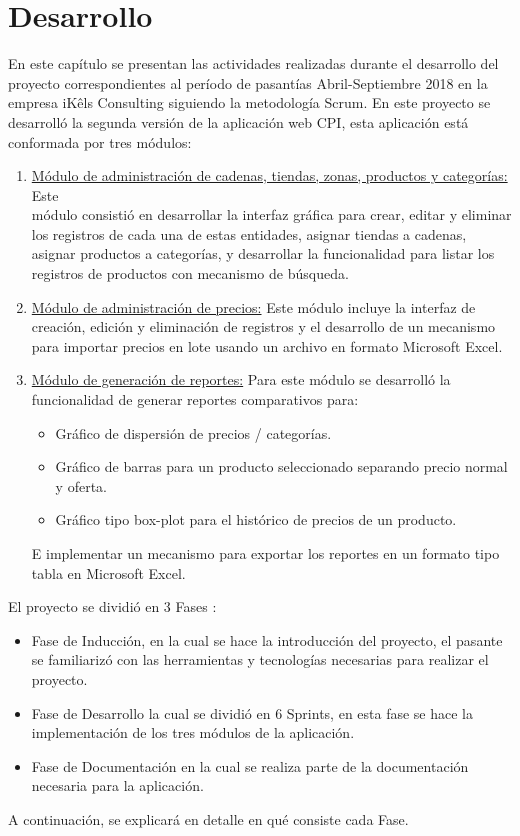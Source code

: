 \chapter{Desarrollo} \label{development}
 

En este capítulo se presentan las actividades realizadas durante el desarrollo del proyecto correspondientes al período de pasantías Abril-Septiembre 2018 en la empresa iKêls Consulting \cite{ikels} siguiendo la metodología Scrum. En este proyecto se desarrolló la segunda versión de la aplicación web CPI, esta aplicación está conformada por tres módulos: 
\begin{enumerate}
    \item \underline{Módulo de administración de cadenas, tiendas, zonas, productos y categorías:} Este\\ módulo consistió en desarrollar la   interfaz gráfica para crear, editar y eliminar los registros de cada una de estas entidades, asignar tiendas a cadenas, asignar productos a categorías, y desarrollar la funcionalidad para listar los registros de productos con mecanismo de búsqueda. 
   \item \underline{Módulo de administración de precios:} Este módulo incluye la interfaz de creación, edición y eliminación de registros y el desarrollo de un mecanismo para importar precios en lote usando un archivo en formato Microsoft Excel.
    \item \underline{Módulo de generación de reportes:} Para este módulo se desarrolló la funcionalidad de generar reportes comparativos para:
   \begin{itemize}
       \item Gráfico de dispersión de precios / categorías.
       \item Gráfico de barras para un producto seleccionado separando precio normal y oferta.
       \item Gráfico tipo box-plot para el histórico de precios de un producto.
    \end{itemize}
    E implementar un mecanismo para exportar los reportes en un formato tipo tabla en Microsoft Excel.
\end{enumerate}
   El proyecto se dividió en 3 Fases :
\begin{itemize}
  \item Fase de Inducción, en la cual se hace la introducción del proyecto, el pasante se familiarizó con las herramientas y tecnologías necesarias para realizar el proyecto.
  \item Fase de Desarrollo la cual se dividió en 6 Sprints, en esta fase se hace la implementación de los tres módulos de la aplicación.
  \item Fase de Documentación en la cual se realiza parte de la documentación necesaria para la aplicación.
\end{itemize}
A continuación, se explicará en detalle en qué consiste cada Fase.

